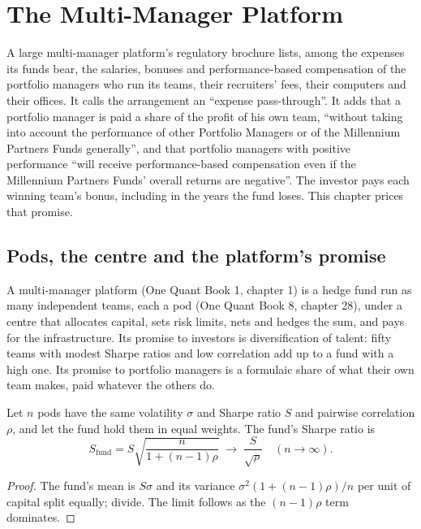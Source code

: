 \chapter{The Multi-Manager Platform}\label{ch:fm:the-multi-manager-platform}

A large multi-manager platform's regulatory brochure lists, among the expenses its funds bear, the salaries, bonuses and performance-based
compensation of the portfolio managers who run its teams, their recruiters' fees, their computers and their offices. It calls the arrangement an
``expense pass-through''. It adds that a portfolio manager is paid a share of the profit of his own team, ``without taking into account the
performance of other Portfolio Managers or of the Millennium Partners Funds generally'', and that portfolio managers with positive performance
``will receive performance-based compensation even if the Millennium Partners Funds' overall returns are negative''. The investor pays each
winning team's bonus, including in the years the fund loses. This chapter prices that promise.

\section{Pods, the centre and the platform's promise}

A multi-manager platform (One Quant Book 1, chapter 1) is a hedge fund run as many independent teams, each a pod (One Quant Book 8, chapter 28),
under a centre that allocates capital, sets risk limits, nets and hedges the sum, and pays for the infrastructure. Its promise to investors is
diversification of talent: fifty teams with modest Sharpe ratios and low correlation add up to a fund with a high one. Its promise to portfolio
managers is a formulaic share of what their own team makes, paid whatever the others do.

\begin{proposition}\label{prop:fm:the-multi-manager-platform:div}
Let $n$ pods have the same volatility $\sigma$ and Sharpe ratio $S$ and pairwise correlation $\rho$, and let the fund hold them in equal weights.
The fund's Sharpe ratio is
\[
S_{\mathrm{fund}}=S\sqrt{\frac{n}{1+(n-1)\rho}}\;\longrightarrow\;\frac{S}{\sqrt\rho}\quad(n\to\infty).
\]
\end{proposition}

\begin{proof}
The fund's mean is $S\sigma$ and its variance $\sigma^2(1+(n-1)\rho)/n$ per unit of capital split equally; divide. The limit follows as the
$(n-1)\rho$ term dominates.
\end{proof}

